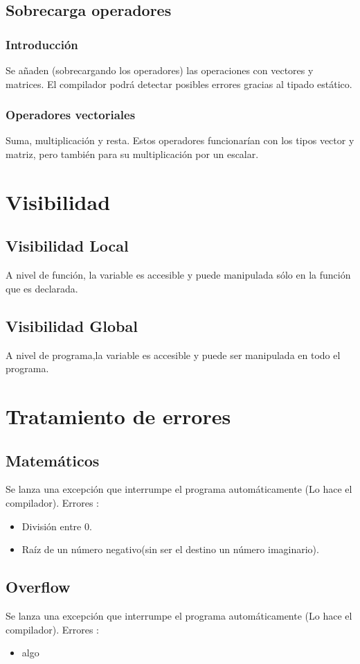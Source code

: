 \documentclass[12pt,a4paper]{article}
\begin{document}
\subsection{Sobrecarga operadores}
\subsubsection{Introducción}
Se añaden (sobrecargando los operadores) las operaciones con vectores y matrices. El compilador podrá detectar posibles errores gracias al tipado estático.
\subsubsection{Operadores vectoriales}
Suma, multiplicación y resta. Estos operadores funcionarían con los tipos vector y matriz, pero también para su multiplicación por un escalar.
\section{Visibilidad}
\subsection{Visibilidad Local}
A nivel de función, la variable es accesible y puede manipulada sólo en la función que es declarada. 
\subsection{Visibilidad Global}
A nivel de programa,la variable es accesible y puede ser  manipulada en todo el programa.
\section{Tratamiento de errores}
\subsection{Matemáticos}
Se lanza una excepción que interrumpe el programa automáticamente (Lo hace el compilador).
Errores :
\begin{itemize}
\item División entre 0.
\item Raíz de un número negativo(sin ser el destino un número imaginario).
\end{itemize}
\subsection{Overflow}
Se lanza una excepción que interrumpe el programa automáticamente (Lo hace el compilador).
Errores :
\begin{itemize}
\item algo
\end{itemize}
\end{document}
